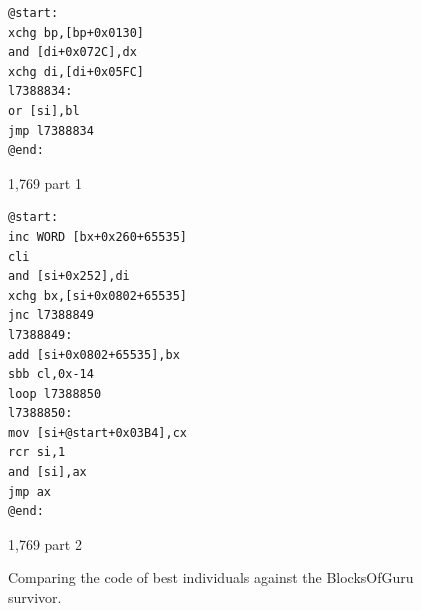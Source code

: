 \documentclass[dvipsnames, format=sigconf]{acmart}
\begin{document}
\begin{figure}
\captionsetup{type=lstlisting}
\centering
\begin{sublstlisting}[b]{0.38\linewidth}
\begin{lstlisting}
@start:
xchg bp,[bp+0x0130]
and [di+0x072C],dx
xchg di,[di+0x05FC]
l7388834:
or [si],bl
jmp l7388834
@end:
\end{lstlisting}
\caption{1,769 part 1}
\end{sublstlisting}
\qquad
\begin{sublstlisting}[b]{0.5\linewidth}
\begin{lstlisting}
@start:
inc WORD [bx+0x260+65535]
cli
and [si+0x252],di
xchg bx,[si+0x0802+65535]
jnc l7388849
l7388849:
add [si+0x0802+65535],bx
sbb cl,0x-14
loop l7388850
l7388850:
mov [si+@start+0x03B4],cx
rcr si,1
and [si],ax
jmp ax
@end:
\end{lstlisting}
\caption{1,769 part 2}
\end{sublstlisting}
\caption{Comparing the code of best individuals against the BlocksOfGuru survivor.}
\label{lst:BlocksOfGuru:b}
\end{figure}
\end{document}

